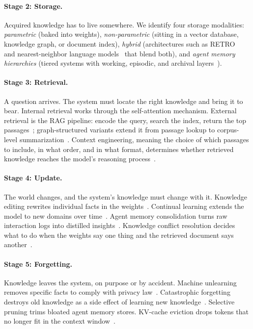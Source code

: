 \documentclass[10pt]{article}
\begin{document}
\paragraph{Stage 2: Storage.} Acquired knowledge has to live somewhere. We identify four storage modalities: \textit{parametric} (baked into weights), \textit{non-parametric} (sitting in a vector database, knowledge graph, or document index), \textit{hybrid} (architectures such as RETRO~\citep{borgeaud2022retro} and nearest-neighbor language models~\citep{khandelwal2020knnlm} that blend both), and \textit{agent memory hierarchies} (tiered systems with working, episodic, and archival layers~\citep{packer2023memgpt}).

\paragraph{Stage 3: Retrieval.} A question arrives. The system must locate the right knowledge and bring it to bear. Internal retrieval works through the self-attention mechanism. External retrieval is the RAG pipeline: encode the query, search the index, return the top passages~\citep{karpukhin2020dpr}; graph-structured variants extend it from passage lookup to corpus-level summarization~\citep{edge2024graphrag}. Context engineering, meaning the choice of which passages to include, in what order, and in what format, determines whether retrieved knowledge reaches the model's reasoning process~\citep{liu2024lost}.

\paragraph{Stage 4: Update.} The world changes, and the system's knowledge must change with it. Knowledge editing rewrites individual facts in the weights~\citep{meng2022rome, meng2023memit}. Continual learning extends the model to new domains over time~\citep{kirkpatrick2017ewc}. Agent memory consolidation turns raw interaction logs into distilled insights~\citep{park2023generative}. Knowledge conflict resolution decides what to do when the weights say one thing and the retrieved document says another~\citep{xie2024conflicts, longpre2021entity}.

\paragraph{Stage 5: Forgetting.} Knowledge leaves the system, on purpose or by accident. Machine unlearning removes specific facts to comply with privacy law~\citep{jang2023unlearning, maini2024tofu}. Catastrophic forgetting destroys old knowledge as a side effect of learning new knowledge~\citep{kirkpatrick2017ewc, luo2023catastrophic}. Selective pruning trims bloated agent memory stores. KV-cache eviction drops tokens that no longer fit in the context window~\citep{xiao2024streamingllm}.
\end{document}
